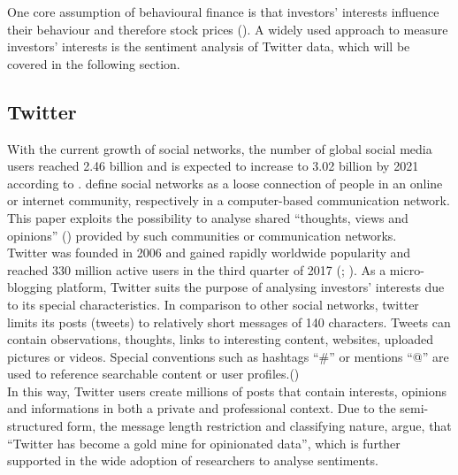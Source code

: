 \documentclass[a4paper,american,12pt]{article}
\begin{document}
\begin{spacing}{1.2}
One core assumption of behavioural finance is that investors’ interests influence their behaviour and therefore stock prices (\cite[p.~3]{mao2015quantifying}). A widely used approach to measure investors’ interests is the sentiment analysis of Twitter data, which will be covered in the following section.\\

\subsection{Twitter}
With the current growth of social networks, the number of global social media users reached 2.46 billion and is expected to increase to 3.02 billion by 2021 according to \textcite{Statista2018a}. \textcite[p.~12]{Gabriel2017socialmedia} define social networks as a loose connection of people in an online or internet community, respectively in a computer-based communication network. This paper exploits the possibility to analyse shared “thoughts, views and opinions” (\cite[p.~6]{stenqvist2017predicting}) provided by such communities or communication networks.\\

Twitter was founded in 2006 and gained rapidly worldwide popularity and reached 330 million active users in the third quarter of 2017  (\cite[]{twitterinc2018}; \cite[]{Statista2018b}). As a micro-blogging platform, Twitter suits the purpose of analysing investors’ interests due to its special characteristics. In comparison to other social networks, twitter limits its posts (tweets) to relatively short messages of 140 characters. Tweets can contain observations, thoughts, links to interesting content, websites, uploaded pictures or videos. Special conventions such as hashtags “\#” or mentions “@” are used to reference searchable content or user profiles.(\cite{Schmidt2018socialmedia})\\

In this way, Twitter users create millions of posts that contain interests, opinions and informations in both a private and professional context.  Due to the semi-structured form, the message length restriction and classifying nature, \textcite[p.~6]{stenqvist2017predicting} argue, that “Twitter has become a gold mine for opinionated data”, which is further supported in the wide adoption of researchers to analyse sentiments.\\


\end{spacing}
\end{document}
